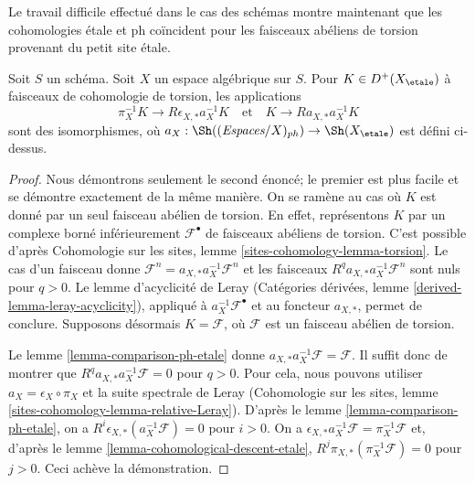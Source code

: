 \noindent
Le travail difficile effectué dans le cas des schémas montre maintenant que
les cohomologies étale et ph coïncident pour les faisceaux abéliens de torsion
provenant du petit site étale.

\begin{lemma}
\label{lemma-cohomological-descent-etale-ph}
Soit $S$ un schéma. Soit $X$ un espace algébrique sur $S$.
Pour $K \in D^+(X_\etale)$ à faisceaux de cohomologie de torsion, les applications
$$
\pi_X^{-1}K \longrightarrow R\epsilon_{X, *}a_X^{-1}K
\quad\text{et}\quad
K \longrightarrow Ra_{X, *}a_X^{-1}K
$$
sont des isomorphismes, où
$a_X : \Sh((\textit{Espaces}/X)_{ph}) \to \Sh(X_\etale)$ est défini ci-dessus.
\end{lemma}

\begin{proof}
Nous démontrons seulement le second énoncé; le premier est plus facile et se
démontre exactement de la même manière. On se ramène au cas où $K$ est donné
par un seul faisceau abélien de torsion. En effet, représentons $K$ par un
complexe borné inférieurement $\mathcal{F}^\bullet$ de faisceaux abéliens de
torsion. C'est possible d'après Cohomologie sur les sites, lemme
\ref{sites-cohomology-lemma-torsion}.
Le cas d'un faisceau donne
$\mathcal{F}^n = a_{X, *} a_X^{-1} \mathcal{F}^n$
et les faisceaux $R^qa_{X, *}a_X^{-1}\mathcal{F}^n$ sont nuls pour $q > 0$.
Le lemme d'acyclicité de Leray (Catégories dérivées, lemme
\ref{derived-lemma-leray-acyclicity}), appliqué à
$a_X^{-1}\mathcal{F}^\bullet$ et au foncteur $a_{X, *}$, permet de conclure.
Supposons désormais $K = \mathcal{F}$, où $\mathcal{F}$ est un faisceau
abélien de torsion.

\medskip\noindent
Le lemme \ref{lemma-comparison-ph-etale} donne
$a_{X, *}a_X^{-1}\mathcal{F} = \mathcal{F}$. Il suffit donc de montrer que
$R^qa_{X, *}a_X^{-1}\mathcal{F} = 0$ pour $q > 0$.
Pour cela, nous pouvons utiliser $a_X = \epsilon_X \circ \pi_X$ et la suite
spectrale de Leray (Cohomologie sur les sites, lemme
\ref{sites-cohomology-lemma-relative-Leray}).
D'après le lemme \ref{lemma-comparison-ph-etale}, on a
$R^i\epsilon_{X, *}(a_X^{-1}\mathcal{F}) = 0$ pour $i > 0$.
On a
$\epsilon_{X, *}a_X^{-1}\mathcal{F} = \pi_X^{-1}\mathcal{F}$
et, d'après le lemme \ref{lemma-cohomological-descent-etale},
$R^j\pi_{X, *}(\pi_X^{-1}\mathcal{F}) = 0$ pour $j > 0$.
Ceci achève la démonstration.
\end{proof}

